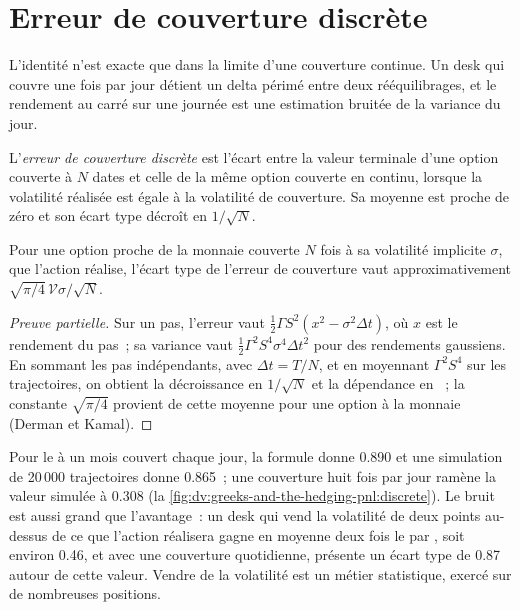 \section{Erreur de couverture discrète}

L'identité n'est exacte que dans la limite d'une couverture continue. Un desk qui couvre
une fois par jour détient un delta périmé entre deux rééquilibrages, et le rendement au carré
sur une journée est une estimation bruitée de la variance du jour.

\begin{definition}\label{def:dv:greeks-and-the-hedging-pnl:dhe}
L'\emph{erreur de couverture discrète} est l'écart entre la
valeur terminale d'une option couverte à $N$ dates et celle de la même
option couverte en continu, lorsque la volatilité réalisée est égale à la volatilité de couverture.
Sa moyenne est proche de zéro et son écart type décroît en $1/\sqrt N$.
\end{definition}

\begin{proposition}\label{prop:dv:greeks-and-the-hedging-pnl:dk}
Pour une option proche de la monnaie couverte $N$ fois à sa volatilité implicite $\sigma$,
que l'action réalise, l'écart type de l'erreur de couverture vaut
approximativement $\sqrt{\pi/4}\,\mathcal V\sigma/\sqrt N$.
\end{proposition}
\begin{proof}[Preuve partielle]
Sur un pas, l'erreur vaut $\tfrac12\Gamma S^2(x^2-\sigma^2\Delta t)$, où $x$ est le
rendement du pas~; sa variance vaut $\tfrac12\Gamma^2S^4\sigma^4\Delta t^2$ pour des rendements
gaussiens. En sommant les pas indépendants, avec $\Delta t=T/N$, et en moyennant
$\Gamma^2S^4$ sur les trajectoires, on obtient la décroissance en $1/\sqrt N$ et la dépendance en ~; la
constante $\sqrt{\pi/4}$ provient de cette moyenne pour une option à la monnaie
(Derman et Kamal).
\end{proof}

Pour le  à un mois couvert chaque jour, la formule donne 0.890 et une simulation
de 20\,000 trajectoires donne 0.865~; une couverture huit fois par jour ramène la valeur simulée
à 0.308 (la \cref{fig:dv:greeks-and-the-hedging-pnl:discrete}). Le bruit est
aussi grand que l'avantage~: un desk qui vend la volatilité de deux points au-dessus de ce que
l'action réalisera gagne en moyenne deux fois le  par , soit environ 0.46, et
avec une couverture quotidienne, présente un écart type de 0.87 autour de cette valeur. Vendre de la volatilité
est un métier statistique, exercé sur de nombreuses positions.

